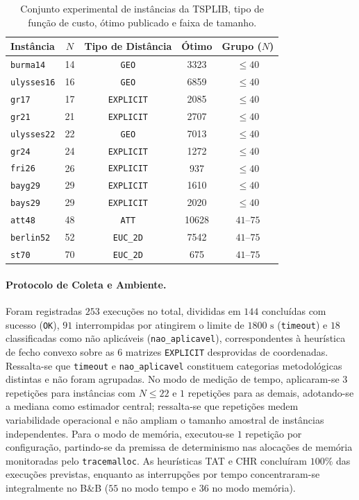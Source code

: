 \documentclass[12pt]{article}
\begin{document}
\begin{table}[ht]
\centering
\caption{Conjunto experimental de instâncias da TSPLIB, tipo de função de custo, ótimo publicado e faixa de tamanho.}
\label{tab:instancias}
\small
\begin{tabular}{lcccc}
\toprule
\textbf{Instância} & \textbf{$N$} & \textbf{Tipo de Distância} & \textbf{Ótimo} & \textbf{Grupo ($N$)} \\
\midrule
\texttt{burma14}   & 14 & \texttt{GEO}      & 3323  & $\le 40$ \\
\texttt{ulysses16} & 16 & \texttt{GEO}      & 6859  & $\le 40$ \\
\texttt{gr17}      & 17 & \texttt{EXPLICIT} & 2085  & $\le 40$ \\
\texttt{gr21}      & 21 & \texttt{EXPLICIT} & 2707  & $\le 40$ \\
\texttt{ulysses22} & 22 & \texttt{GEO}      & 7013  & $\le 40$ \\
\texttt{gr24}      & 24 & \texttt{EXPLICIT} & 1272  & $\le 40$ \\
\texttt{fri26}     & 26 & \texttt{EXPLICIT} & 937   & $\le 40$ \\
\texttt{bayg29}    & 29 & \texttt{EXPLICIT} & 1610  & $\le 40$ \\
\texttt{bays29}    & 29 & \texttt{EXPLICIT} & 2020  & $\le 40$ \\
\texttt{att48}     & 48 & \texttt{ATT}      & 10628 & $41$--$75$ \\
\texttt{berlin52}  & 52 & \texttt{EUC\_2D}  & 7542  & $41$--$75$ \\
\texttt{st70}      & 70 & \texttt{EUC\_2D}  & 675   & $41$--$75$ \\
\bottomrule
\end{tabular}
\end{table}

\paragraph{Protocolo de Coleta e Ambiente.} Foram registradas $253$ execuções no total, divididas em $144$ concluídas com sucesso (\texttt{OK}), $91$ interrompidas por atingirem o limite de $1800\text{ s}$ (\texttt{timeout}) e $18$ classificadas como não aplicáveis (\texttt{nao\_aplicavel}), correspondentes à heurística de fecho convexo sobre as $6$ matrizes \texttt{EXPLICIT} desprovidas de coordenadas. Ressalta-se que \texttt{timeout} e \texttt{nao\_aplicavel} constituem categorias metodológicas distintas e não foram agrupadas. No modo de medição de tempo, aplicaram-se $3$ repetições para instâncias com $N \le 22$ e $1$ repetições para as demais, adotando-se a mediana como estimador central; ressalta-se que repetições medem variabilidade operacional e não ampliam o tamanho amostral de instâncias independentes. Para o modo de memória, executou-se $1$ repetição por configuração, partindo-se da premissa de determinismo nas alocações de memória monitoradas pelo \texttt{tracemalloc}. As heurísticas TAT e CHR concluíram $100\%$ das execuções previstas, enquanto as interrupções por tempo concentraram-se integralmente no B\&B ($55$ no modo tempo e $36$ no modo memória).
\end{document}
